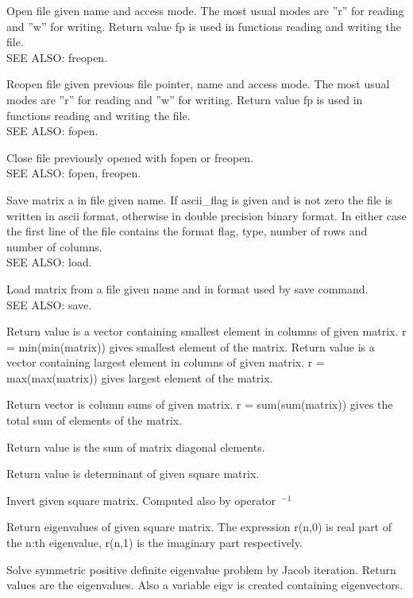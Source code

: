 Open file given name and access mode. The most usual modes are ''r'' for reading and ''w'' for writing. Return value fp is used in functions reading and writing the file. \\
SEE ALSO: freopen. 

Reopen file given previous file pointer, name and access mode. The most usual modes are ''r'' for reading and ''w'' for writing. Return value fp is used in functions reading and writing the file. \\
SEE ALSO: fopen. 

Close file previously opened with fopen or freopen. \\
SEE ALSO: fopen, freopen. 

Save matrix a in file given name. If ascii\_flag is given and is not zero the file is written in ascii format, otherwise in double precision binary format. In either case the first line of the file contains the format flag, type, number of rows and number of columns. \\
SEE ALSO: load. 

Load matrix from a file given name and in format used by save command. \\
SEE ALSO: save. 

Return value is a vector containing smallest element in columns of given matrix. r = min(min(matrix)) gives smallest element of the matrix. 
Return value is a vector containing largest element in columns of given matrix. r = max(max(matrix)) gives largest element of the matrix. 

Return vector is column sums of given matrix. r = sum(sum(matrix)) gives the total sum of elements of the matrix.

Return value is the sum of matrix diagonal elements. 

Return value is determinant of given square matrix. 

Invert given square matrix. Computed also by operator~$^{-1}$

Return eigenvalues of given square matrix. The expression r(n,0) is real part of the n:th eigenvalue, r(n,1) is the imaginary part respectively. 

Solve symmetric positive definite eigenvalue problem by Jacob iteration. Return values are the eigenvalues. Also a variable eigv is created containing eigenvectors. 


